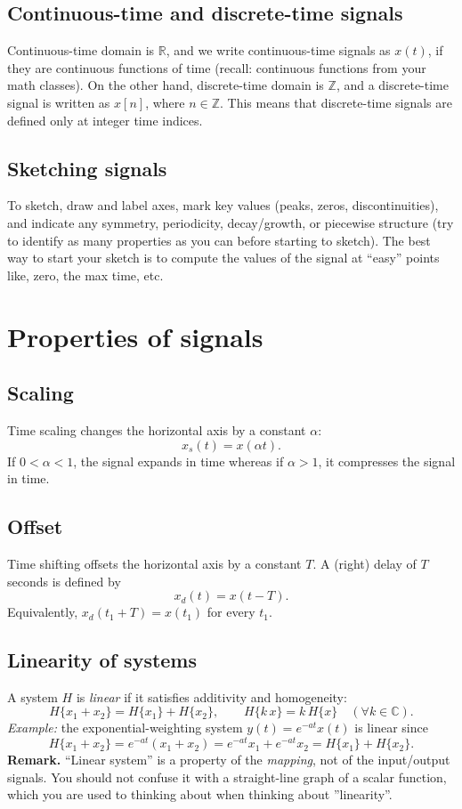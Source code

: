 \documentclass{ee102_notes}
\begin{document}
\subsection{Continuous-time and discrete-time signals}
Continuous-time domain is $\mathbb{R}$, and we write continuous-time signals as $x(t)$, if they are continuous functions of time (recall: continuous functions from your math classes). On the other hand, discrete-time domain is $\mathbb{Z}$, and a discrete-time signal is written as $x[n]$, where $n \in \mathbb{Z}$. This means that discrete-time signals are defined only at integer time indices.
\subsection{Sketching signals}
To sketch, draw and label axes, mark key values (peaks, zeros, discontinuities), and indicate any symmetry, periodicity, decay/growth, or piecewise structure (try to identify as many properties as you can before starting to sketch). The best way to start your sketch is to compute the values of the signal at ``easy'' points like, zero, the max time, etc.  

\section{Properties of signals}
\subsection{Scaling}
Time scaling changes the horizontal axis by a constant $\alpha$:
\[
x_s(t)=x(\alpha t).
\]
If $0<\alpha<1$, the signal expands in time whereas if $\alpha>1$, it compresses the signal in time.

\subsection{Offset}
Time shifting offsets the horizontal axis by a constant $T$.  A (right) delay of $T$ seconds is defined by
\[
x_d(t)=x(t-T).
\]
Equivalently, $x_d(t_1+T)=x(t_1)$ for every $t_1$.

\subsection{Linearity of systems}
A system $H$ is \emph{linear} if it satisfies additivity and homogeneity:
\[
H\{x_1+x_2\}=H\{x_1\}+H\{x_2\},\qquad H\{k\,x\}=k\,H\{x\}\quad(\forall k\in\mathbb{C}).
\]
\textit{Example:} the exponential-weighting system $y(t)=e^{-a t}x(t)$ is linear since
\[
H\{x_1+x_2\}=e^{-a t}(x_1+x_2)=e^{-a t}x_1+e^{-a t}x_2=H\{x_1\}+H\{x_2\}.
\]
\textbf{Remark.} ``Linear system'' is a property of the \emph{mapping}, not of the input/output signals. You should not confuse it with a straight-line graph of a scalar function, which you are used to thinking about when thinking about ''linearity''.
\end{document}
